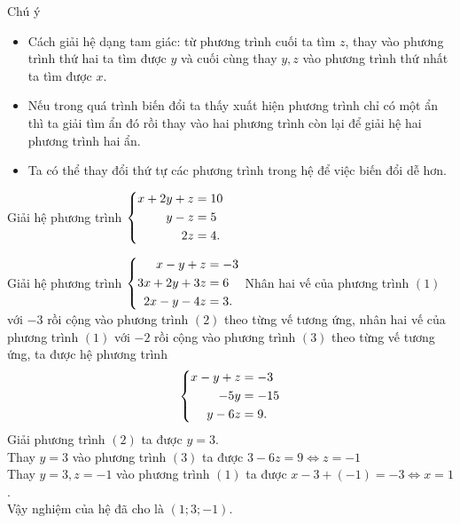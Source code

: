 \begin{note}
Chú ý
\begin{itemize}
\item Cách  giải hệ dạng tam giác: từ phương trình cuối ta tìm $z$, thay vào phương trình thứ hai ta tìm được $y$ và cuối cùng thay $y, z$ vào phương trình thứ nhất ta tìm được $x$.
\item Nếu trong quá trình biến đổi ta thấy xuất hiện phương trình chỉ có một ẩn thì ta giải tìm ẩn đó rồi thay vào hai phương trình còn lại để giải hệ hai phương trình hai ẩn.
\item Ta có thể thay đổi thứ tự các phương trình trong hệ để việc biến đổi dễ hơn.
\end{itemize}
\end{note}

\begin{vd}%
Giải hệ phương trình $\left\{\begin{aligned}x+2y+z&=10\\y-z&=5\\2z&=4.\end{aligned}\right.$
\end{vd}

\begin{vd}%
Giải hệ phương trình $\left\{\begin{aligned}x-y+z&=-3\\3x+2y+3z&=6\\2x-y-4z&=3.\end{aligned}\right.$
\loigiai
{Nhân hai vế  của phương trình $(1)$ với $-3$ rồi cộng vào phương trình $(2)$ theo từng vế tương ứng, nhân hai vế  của phương trình $(1)$ với $-2$ rồi cộng vào phương trình $(3)$ theo từng vế tương ứng, ta được hệ phương trình\\
\[\left\{\begin{aligned}x-y+z&=-3\\-5y&=-15\\y-6z&=9.\end{aligned}\right.\]
Giải phương trình $(2)$ ta được $y=3$.\\
Thay $y=3$ vào phương trình $(3)$ ta được $3-6z=9 \Leftrightarrow z=-1$\\
Thay $y=3, z=-1$ vào phương trình $(1)$ ta được $x-3+(-1)=-3 \Leftrightarrow x=1$.\\
Vậy nghiệm của hệ đã cho là $(1;3;-1)$.}
\end{vd}

